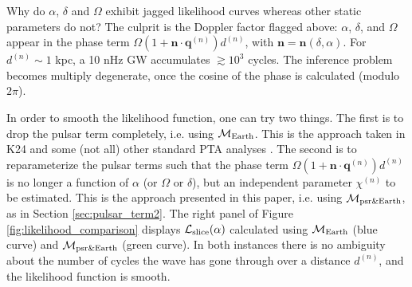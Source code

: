 \documentclass[fleqn,usenatbib,useAMS]{mnras}
\begin{document}
Why do $\alpha$, $\delta$ and $\Omega$ exhibit jagged likelihood curves whereas other static parameters do not? The culprit is the Doppler factor flagged above: $\alpha$, $\delta$, and $\Omega$ appear in the phase term $\Omega \left(1 + \boldsymbol{n}\cdot \boldsymbol{q}^{(n)} \right)  d^{(n)}$, with $\boldsymbol{n} = \boldsymbol{n}(\delta, \alpha)$. For $d^{(n)} \sim 1$ kpc, a 10 nHz GW accumulates $ \gtrsim 10^3$ cycles. The inference problem becomes multiply degenerate, once the cosine of the phase is calculated (modulo $2\pi$). \newline 


In order to smooth the likelihood function, one can try two things. The first is to drop the pulsar term completely, i.e. using $\mathcal{M}_{\rm Earth}$. This is the approach taken in K24 and some (not all) other standard PTA analyses \citep[e.g.][]{Sesana2010,Babak2012,Petiteau2013,Zhu2015,Taylors2016,Goldstein2018,Charisi2023arXiv230403786C}. The second is to reparameterize the pulsar terms such that the phase term $\Omega \left(1 + \boldsymbol{n}\cdot \boldsymbol{q}^{(n)} \right)  d^{(n)}$ is no longer a function of $\alpha$ (or $\Omega$ or $\delta$), but an independent parameter $\chi^{(n)}$ to be estimated. This is the approach presented in this paper, i.e. using $\mathcal{M}_{\rm psr \& Earth}$, as in Section \ref{sec:pulsar_term2}. The right panel of Figure \ref{fig:likelihood_comparison} displays $\mathcal{L}_{\rm slice}(\alpha)$ calculated using $\mathcal{M}_{\rm Earth}$ (blue curve) and $\mathcal{M}_{\rm psr \& Earth}$ (green curve). In both instances there is no ambiguity about the number of cycles the wave has gone through over a distance $d^{(n)}$, and the likelihood function is smooth.










\bsp	%
\label{lastpage}
\end{document}
